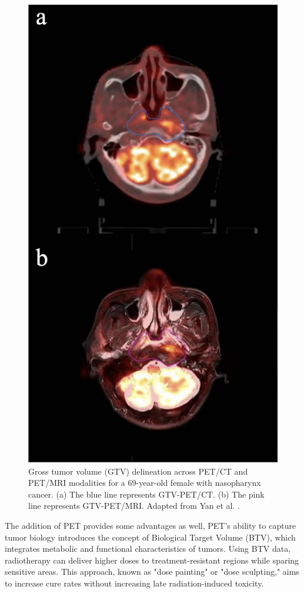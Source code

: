 \documentclass[11pt]{article} %
\begin{document}
\begin{multicols}{2}
\begin{figure}[H]
\centering
\includegraphics[width=0.8\columnwidth]{assets/GTV_Delineation_PETCT_vs_PETMRI.png} 
\caption{Gross tumor volume (GTV) delineation across PET/CT and PET/MRI modalities for a 69-year-old female with nasopharynx cancer. (a) The blue line represents GTV-PET/CT. (b) The pink line represents GTV-PET/MRI. Adapted from Yan et al. \cite{yan2024}.}
\label{fig:gtv_delineation_cropped}
\end{figure}

The addition of PET provides some advantages as well, PET’s ability to capture tumor biology introduces the concept of Biological Target Volume (BTV), which integrates metabolic and functional characteristics of tumors. Using BTV data, radiotherapy can deliver higher doses to treatment-resistant regions while sparing sensitive areas. This approach, known as "dose painting" or "dose sculpting," aims to increase cure rates without increasing late radiation-induced toxicity. \cite{Schinagl2006}


\end{multicols}
\end{document}
